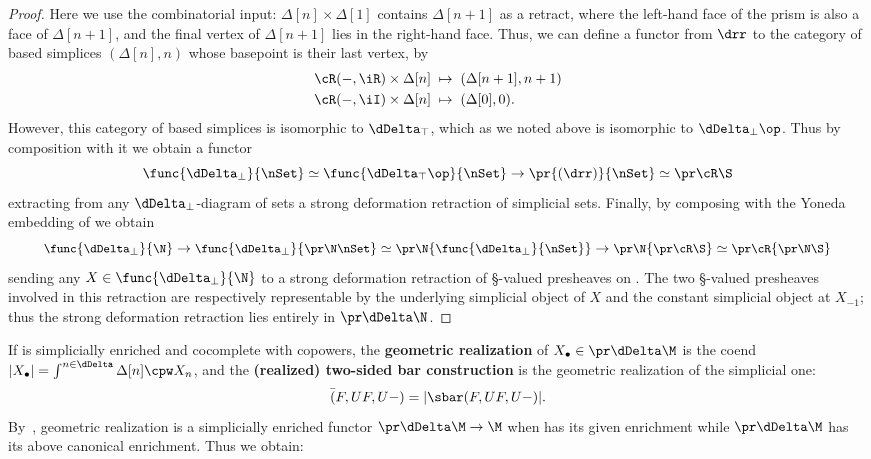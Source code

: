 \begin{proof}
  Here we use the combinatorial input: $\Delta[n]\times\Delta[1]$ contains $\Delta[n+1]$ as a retract, where the left-hand face of the prism is also a face of $\Delta[n+1]$, and the final vertex of $\Delta[n+1]$ lies in the right-hand face.
  Thus, we can define a functor from $\drr$ to the category of based simplices $(\Delta[n],n)$ whose basepoint is their last vertex, by
  \begin{align*}
    \cR(-,\iR)\times \Delta[n] &\;\mapsto\; (\Delta[n+1],n+1)\\
    \cR(-,\iI)\times \Delta[n] &\;\mapsto\; (\Delta[0],0).
  \end{align*}
  However, this category of based simplices is isomorphic to $\dDelta_\top$, which as we noted above is isomorphic to $\dDelta_\bot\op$.
  Thus by composition with it we obtain a functor
  \[ \func{\dDelta_\bot}{\nSet} \simeq \func{\dDelta_\top\op}{\nSet} \to \pr{(\drr)}{\nSet} \simeq \pr\cR\S \]
  extracting from any $\dDelta_\bot$-diagram of sets a strong deformation retraction of simplicial sets.
  Finally, by composing with the Yoneda embedding of \N we obtain
  \begin{equation*}\small
  \func{\dDelta_\bot}{\N} \to \func{\dDelta_\bot}{\pr\N\nSet}
    \simeq \pr\N{\func{\dDelta_\bot}{\nSet}}
    \to \pr\N{\pr\cR\S} \simeq \pr\cR{\pr\N\S}
  \end{equation*}
  sending any $X\in\func{\dDelta_\bot}{\N}$ to a strong deformation retraction of \S-valued presheaves on \N.
  The two \S-valued presheaves involved in this retraction are respectively representable by the underlying simplicial object of $X$ and the constant simplicial object at $X_{-1}$; thus the strong deformation retraction lies entirely in $\pr\dDelta\N$.
\end{proof}

If \M is simplicially enriched and cocomplete with copowers, the \textbf{geometric realization} of $X_\bullet \in \pr\dDelta\M$ is the coend
\( |X_\bullet| = \int^{n\in\dDelta} \Delta[n] \cpw X_n \),
and the \textbf{(realized) two-sided bar construction} is the geometric realization of the simplicial one:
\[ \bar(F,UF,U-) = |\sbar(F,UF,U-)|. \]
By~\cite[Proposition 5.4]{rss:simp}, geometric realization is a simplicially enriched functor $\pr\dDelta\M \to \M$ when \M has its given enrichment while $\pr\dDelta\M$ has its above {canonical} enrichment. %
Thus we obtain:


